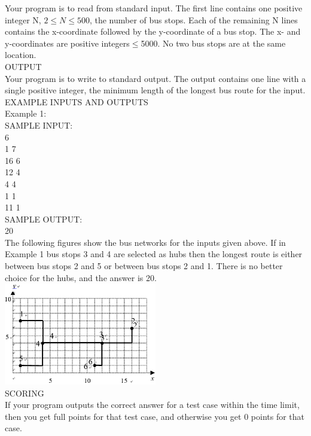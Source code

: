 \documentclass[12pt,twiside,a4paper]{ctexbook}
\numberwithin{chapter}{part}
\begin{document}
Your program is to read from standard input. The first line contains one positive integer N, $2\leq N\leq 500$, the number of bus stops. Each of the remaining N lines contains the x-coordinate followed by the y-coordinate of a bus stop. The x- and y-coordinates are positive integers$\leq$5000.  No two bus stops are at the same location.\\
OUTPUT\\
Your program is to write to standard output. The output contains one line with a single positive integer, the minimum length of the longest bus route for the input.\\
EXAMPLE INPUTS AND OUTPUTS\\
Example 1:\\
SAMPLE INPUT:\\
6\\
1 7\\
16 6\\
12 4\\
4 4\\
1 1\\
11 1\\
SAMPLE OUTPUT:\\
20\\
The following figures show the bus networks for the inputs given above. If in Example 1 bus stops 3 and 4 are selected as hubs then the longest route is either between bus stops 2 and 5 or between bus stops 2 and 1. There is no better choice for the hubs, and the answer is 20. \\
\includegraphics[width=0.5\textwidth]{bus.png}\\
SCORING\\
If your program outputs the correct answer for a test case within the time limit, then you get full points for that test case, and otherwise you get 0 points for that case.
\end{document}
